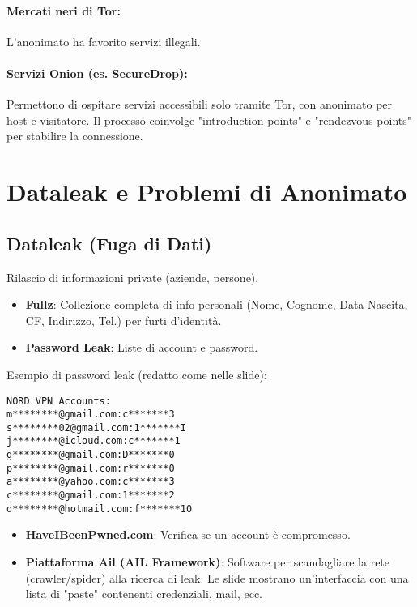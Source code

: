\paragraph{Mercati neri di Tor:} L'anonimato ha favorito servizi illegali.
\paragraph{Servizi Onion (es. SecureDrop):} Permettono di ospitare servizi accessibili solo tramite Tor, con anonimato per host e visitatore. Il processo coinvolge "introduction points" e "rendezvous points" per stabilire la connessione.

\section{Dataleak e Problemi di Anonimato}

\subsection{Dataleak (Fuga di Dati)}
Rilascio di informazioni private (aziende, persone).
\begin{itemize}
    \item \textbf{Fullz}: Collezione completa di info personali (Nome, Cognome, Data Nascita, CF, Indirizzo, Tel.) per furti d'identità.
    \item \textbf{Password Leak}: Liste di account e password.
\end{itemize}
Esempio di password leak (redatto come nelle slide):
\begin{verbatim}
NORD VPN Accounts:
m********@gmail.com:c*******3
s********02@gmail.com:1*******I
j********@icloud.com:c*******1
g********@gmail.com:D*******0
p********@gmail.com:r*******0
a********@yahoo.com:c*******3
c********@gmail.com:1*******2
d********@hotmail.com:f*******10
\end{verbatim}
\begin{itemize}
    \item \textbf{HaveIBeenPwned.com}: Verifica se un account è compromesso.
    \item \textbf{Piattaforma Ail (AIL Framework)}: Software per scandagliare la rete (crawler/spider) alla ricerca di leak. Le slide mostrano un'interfaccia con una lista di "paste" contenenti credenziali, mail, ecc.
\end{itemize}

